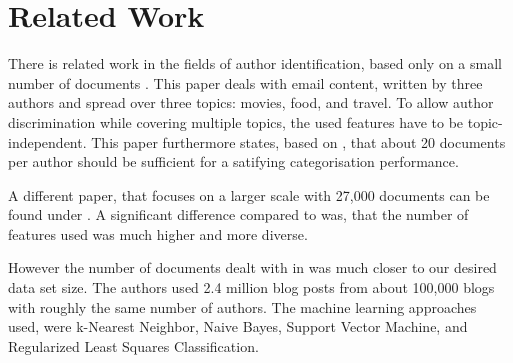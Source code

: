 
\section{Related Work}
\label{sec:related}


There is related work in the fields of author identification, based only on a small number of documents \cite{de2001mining}.
This paper deals with email content, written by three authors and spread over three topics: movies, food, and travel.
To allow author discrimination while covering multiple topics, the used features have to be topic-independent.
This paper furthermore states, based on \cite{corney2001identifying}, that about 20 documents per author should be sufficient for a satifying categorisation performance.


A different paper, that focuses on a larger scale with 27,000 documents can be found under \cite{madigan2005author}. A significant difference compared to \cite{de2001mining} was, that the number of features used was much higher and more diverse.


However the number of documents dealt with in \cite{narayanan2012feasibility} was much closer to our desired data set size.
The authors used 2.4 million blog posts from about 100,000 blogs with roughly the same number of authors.
The machine learning approaches used, were k-Nearest Neighbor, Naive Bayes, Support Vector Machine, and Regularized Least Squares Classification.
